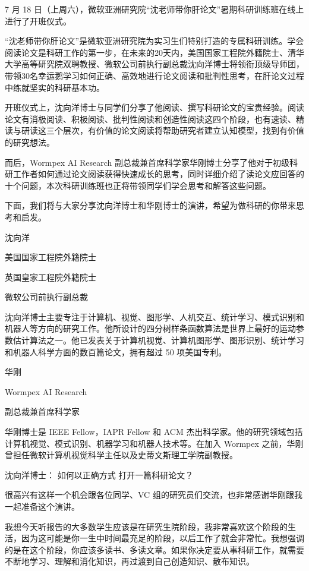7 月 18 日（上周六），微软亚洲研究院“沈老师带你肝论文”暑期科研训练班在线上进行了开班仪式。



“沈老师带你肝论文”是微软亚洲研究院为实习生们特别打造的专属科研训练。学会阅读论文是科研工作的第一步，在未来的20天内，美国国家工程院外籍院士、清华大学高等研究院双聘教授、微软公司前执行副总裁沈向洋博士将领衔顶级导师团，带领30名幸运鹅学习如何正确、高效地进行论文阅读和批判性思考，在肝论文过程中练就坚实的科研基本功。

开班仪式上，沈向洋博士与同学们分享了他阅读、撰写科研论文的宝贵经验。阅读论文有消极阅读、积极阅读、批判性阅读和创造性阅读这四个阶段，也有速读、精读与研读这三个层次，有价值的论文阅读将帮助研究者建立认知模型，找到有价值的研究想法。

而后，Wormpex AI Research 副总裁兼首席科学家华刚博士分享了他对于初级科研工作者如何通过论文阅读获得快速成长的思考，同时详细介绍了读论文应回答的十个问题，本次科研训练班也正将带领同学们学会思考和解答这些问题。


下面，我们将与大家分享沈向洋博士和华刚博士的演讲，希望为做科研的你带来思考和启发。


沈向洋

美国国家工程院外籍院士

英国皇家工程院外籍院士

微软公司前执行副总裁



沈向洋博士主要专注于计算机、视觉、图形学、人机交互、统计学习、模式识别和机器人等方向的研究工作。他所设计的四分树样条函数算法是世界上最好的运动参数估计算法之一。他已发表关于计算机视觉、计算机图形学、图形识别、统计学习和机器人科学方面的数百篇论文，拥有超过 50 项美国专利。


华刚

Wormpex AI Research

副总裁兼首席科学家



华刚博士是 IEEE Fellow，IAPR Fellow 和 ACM 杰出科学家。他的研究领域包括计算机视觉、模式识别、机器学习和机器人技术等。在加入 Wormpex 之前，华刚曾担任微软计算机视觉科学主任以及史蒂文斯理工学院副教授。


沈向洋博士：
如何以正确方式
打开一篇科研论文？


很高兴有这样一个机会跟各位同学、VC 组的研究员们交流，也非常感谢华刚跟我一起准备这个演讲。



我想今天听报告的大多数学生应该是在研究生院阶段，我非常喜欢这个阶段的生活，因为这可能是你一生中时间最充足的阶段，以后工作了就会非常忙。我想强调的是在这个阶段，你应该多读书、多读文章。如果你决定要从事科研工作，就需要不断地学习、理解和消化知识，再过渡到自己创造知识、散布知识。



